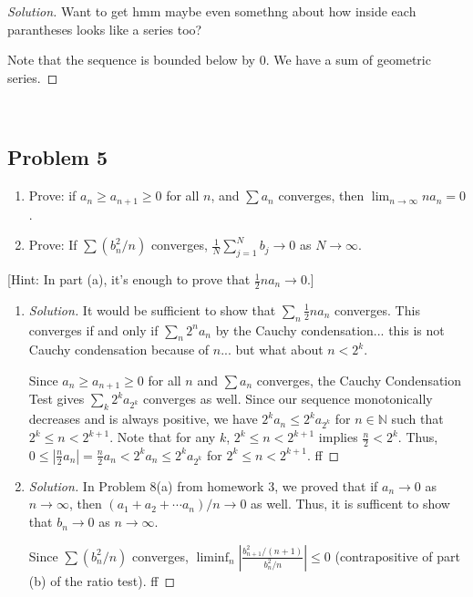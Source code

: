 \documentclass{article}
\newcommand{\N}{{\mathbb N}}
\begin{document}
{\begin{proof}[Solution]
	Want to get hmm maybe even somethng about
	how inside each parantheses looks like a series too?

	Note that the sequence is bounded below by $0$.
	We have a sum of geometric series.
\end{proof}
\clearpage
~\clearpage

\subsection*{Problem 5}
{\it \begin{enumerate}
	\item Prove: if $a_n \geq a_{n+1} \geq 0$ for all $n$,
	and $\sum a_n$ converges, then $\lim_{n\to\infty}na_n = 0$.
	\item Prove: If $\sum(b_n^2/n)$ converges,
	$\frac{1}{N}\sum_{j=1}^N b_j \to 0$ as $N \to \infty$.
\end{enumerate}
[Hint: In part (a), it's enough to prove that $\frac12 na_n \to 0$.]

\begin{enumerate}
	\item \begin{proof}[Solution]\let\qed\relax
		It would be sufficient to show that $\sum_n \frac{1}{2}n a_n$ converges.
		This converges if and only if $\sum_n 2^n a_n$
		by the Cauchy condensation... this is not Cauchy condensation
		because of $n$... but what about $n < 2^k$.

		Since $a_n \geq a_{n+1} \geq 0$ for all $n$
		and $\sum a_n$ converges,
		the Cauchy Condensation Test gives $\sum_k 2^k a_{2^k}$ converges as well.
		Since our sequence monotonically decreases and is always positive,
		we have $2^k a_n \leq 2^ka_{2^k}$ for $n \in \N$ such that $2^{k} \leq n < 2^{k+1}$.
		Note that for any $k$, $2^{k} \leq n < 2^{k+1}$ implies $\frac{n}{2} < 2^k$.
		Thus, $0 \leq |\frac{n}{2}a_n| = \frac{n}{2}a_n < 2^ka_{n} \leq 2^k a_{2^k}$
		for $2^{k} \leq n < 2^{k+1}$.
		ff
	\end{proof}
	\item \begin{proof}[Solution]\let\qed\relax
		In Problem 8(a) from homework 3,
		we proved that if $a_n \to 0$ as $n \to \infty$,
		then $(a_1+a_2+\cdots a_n)/n \to 0$ as well.
		Thus, it is sufficent to show that $b_n \to 0$
		as $n \to \infty$.
		
		Since $\sum (b_n^2/n)$ converges,
		$\liminf_n \left\lvert \frac{b^2_{n+1}/(n+1)}{b^2_n/n}\right\rvert \leq 0$
		(contrapositive of part (b) of the ratio test).
		ff


\end{proof}
\end{enumerate}}}
\end{document}
